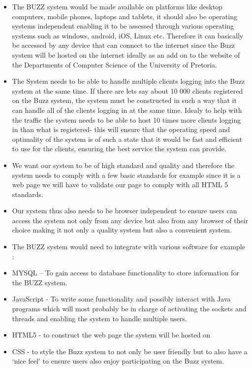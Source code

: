 \documentclass[a4paper]{article}
\begin{document}
\begin{itemize}
\item The BUZZ system would be made available on platforms like desktop computers, mobile phones, laptops and tablets, it should also be operating systems independent enabling it to be assessed through various operating systems such as  windows, android, iOS, Linux etc. Therefore it can basically be accessed by any device that can connect to the internet since the Buzz system will be hosted on the internet ideally as an add on to the website of the Departments of Computer Science of the University of Pretoria. 
\item The System needs to be able to handle multiple clients logging into the Buzz system at the same time. If there are lets say about 10 000 clients registered on the Buzz system, the system must be constructed in such a way that it can handle all of the clients logging in at the same time. Idealy to help with the traffic the system needs to be able to host 10 times more clients logging in than what is registered- this will ensure that the operating speed and optimality of the system is of such a state that it would be fast and efficient to use for the clients, ensuring the best service the system can provide.
\item We want our system to be of high standard and quality and therefore the system needs to comply with a few basic standards for example  since it is a web page we will have to validate our page to comply with all HTML 5 standards. 
\item Our system thus also needs to be browser independent to ensure users can access the system not only from any device but also from any browser of their choice making it not only a quality system but also a convenient system.
\item The BUZZ system would need to integrate with various software for example :
\item  MYSQL – To gain access to database functionality to store information for the BUZZ system.
\item JavaScript - To write some functionality and possibly interact with Java programs which will most probably be in charge of activating the sockets and threads and enabling the system to handle multiple users.
\item HTML5 - to construct the web page the system will be hosted on 
\item CSS - to style the Buzz system to not only be user friendly but to also have a ‘nice feel’ to ensure users also enjoy participating on the Buzz system.
\end{itemize}
\end{document}
